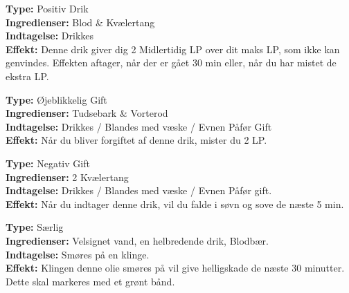 \begin{drik*}[Stenhud]
\textbf{Type:} Positiv Drik\\
\textbf{Ingredienser:} Blod \& Kvælertang\\
\textbf{Indtagelse:} Drikkes\\
\textbf{Effekt:} Denne drik giver dig 2 Midlertidig LP over dit maks LP, som ikke kan genvindes. Effekten aftager, når der er gået 30 min eller, når du har mistet de ekstra LP.\\
\end{drik*}

\begin{gift*}
\textbf{Type:} Øjeblikkelig Gift\\
\textbf{Ingredienser:} Tudsebark \& Vorterod\\
\textbf{Indtagelse:} Drikkes / Blandes med væske / Evnen Påfør Gift\\
\textbf{Effekt:} Når du bliver forgiftet af denne drik, mister du 2 LP.\\
\end{gift*}

\begin{gift*}[Søvndrik]
\textbf{Type:} Negativ Gift\\
\textbf{Ingredienser:} 2 Kvælertang\\
\textbf{Indtagelse:} Drikkes / Blandes med væske / Evnen Påfør gift.\\
\textbf{Effekt:} Når du indtager denne drik, vil du falde i søvn og sove de næste 5 min.\\
\end{gift*}

\begin{særlig*}
\textbf{Type:} Særlig\\
\textbf{Ingredienser:} Velsignet vand, en helbredende drik, Blodbær.\\
\textbf{Indtagelse:} Smøres på en klinge.\\
\textbf{Effekt:} Klingen denne olie smøres på vil give helligskade de næste 30 minutter. Dette skal markeres med et grønt bånd.
\end{særlig*}
